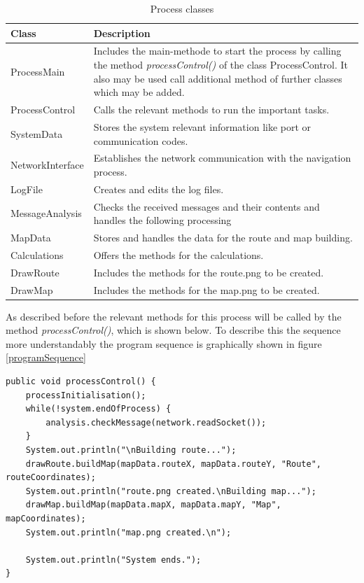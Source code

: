 \begin{table}[h]
\begin{center}
	\begin{tabular}{|p{}|p{}|}
		\hline
		Class & Description\\\hline\hline
		ProcessMain & Includes the main-methode to start the process by calling the method \textit{processControl()} of the class ProcessControl. It also may be used call additional method of further classes which may be added.\\\hline
		ProcessControl & Calls the relevant methods to run the important tasks.\\\hline
		SystemData & Stores the system relevant information like port or communication codes.\\\hline
		NetworkInterface & Establishes the network communication with the navigation process.\\\hline
		LogFile & Creates and edits the log files.\\\hline
		MessageAnalysis & Checks the received messages and their contents and handles the following processing\\\hline
		MapData & Stores and handles the data for the route and map building.\\\hline
		Calculations & Offers the methods for the calculations.\\\hline
		DrawRoute & Includes the methods for the route.png to be created.\\\hline
		DrawMap & Includes the methods for the map.png to be created.\\\hline
	\end{tabular}
	\caption{Process classes}
	\end{center}
\end{table}


As described before the relevant methods for this process will be called by the method \textit{processControl()}, which is shown below. To describe this the sequence more understandably the program sequence is graphically shown in figure \ref{programSequence}

\lstset{language=Java}

\begin{lstlisting}
public void processControl() {
	processInitialisation();
	while(!system.endOfProcess) {
		analysis.checkMessage(network.readSocket());
	}
	System.out.println("\nBuilding route...");
	drawRoute.buildMap(mapData.routeX, mapData.routeY, "Route", routeCoordinates);
	System.out.println("route.png created.\nBuilding map...");
	drawMap.buildMap(mapData.mapX, mapData.mapY, "Map", mapCoordinates);
	System.out.println("map.png created.\n");
		
	System.out.println("System ends.");
}
\end{lstlisting}

